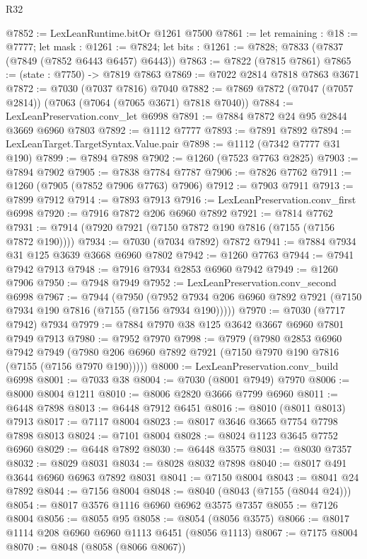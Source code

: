 \begin{lexlean}{R32}
\begin{coremodule}
@7852 := LexLeanRuntime.bitOr @1261 @7500
@7861 := let remaining : @18 := @7777;
  let mask : @1261 := @7824;
  let bits : @1261 := @7828; @7833 (@7837 (@7849 (@7852 @6443 @6457) @6443))
@7863 := @7822 (@7815 @7861)
@7865 := (state : @7750) -> @7819 @7863
@7869 := @7022 @2814 @7818 @7863 @3671
@7872 := @7030 (@7037 @7816) @7040
@7882 := @7869 @7872 (@7047 (@7057 @2814)) (@7063 (@7064 (@7065 @3671) @7818 @7040))
@7884 := LexLeanPreservation.conv_let @6998
@7891 := @7884 @7872 @24 @95 @2844 @3669 @6960 @7803
@7892 := @1112 @7777
@7893 := @7891 @7892
@7894 := LexLeanTarget.TargetSyntax.Value.pair
@7898 := @1112 (@7342 @7777 @31 @190)
@7899 := @7894 @7898
@7902 := @1260 (@7523 @7763 @2825)
@7903 := @7894 @7902
@7905 := @7838 @7784 @7787
@7906 := @7826 @7762
@7911 := @1260 (@7905 (@7852 @7906 @7763) @7906)
@7912 := @7903 @7911
@7913 := @7899 @7912
@7914 := @7893 @7913
@7916 := LexLeanPreservation.conv_first @6998
@7920 := @7916 @7872 @206 @6960 @7892
@7921 := @7814 @7762
@7931 := @7914 (@7920 @7921 (@7150 @7872 @190 @7816 (@7155 (@7156 @7872 @190))))
@7934 := @7030 (@7034 @7892) @7872
@7941 := @7884 @7934 @31 @125 @3639 @3668 @6960 @7802
@7942 := @1260 @7763
@7944 := @7941 @7942 @7913
@7948 := @7916 @7934 @2853 @6960 @7942
@7949 := @1260 @7906
@7950 := @7948 @7949
@7952 := LexLeanPreservation.conv_second @6998
@7967 := @7944
    (@7950 (@7952 @7934 @206 @6960 @7892 @7921 (@7150 @7934 @190 @7816 (@7155 (@7156 @7934 @190)))))
@7970 := @7030 (@7717 @7942) @7934
@7979 := @7884 @7970 @38 @125 @3642 @3667 @6960 @7801 @7949 @7913
@7980 := @7952 @7970
@7998 := @7979
    (@7980
      @2853
      @6960
      @7942
      @7949
      (@7980 @206 @6960 @7892 @7921 (@7150 @7970 @190 @7816 (@7155 (@7156 @7970 @190)))))
@8000 := LexLeanPreservation.conv_build @6998
@8001 := @7033 @38
@8004 := @7030 (@8001 @7949) @7970
@8006 := @8000 @8004 @1211
@8010 := @8006 @2820 @3666 @7799 @6960
@8011 := @6448 @7898
@8013 := @6448 @7912 @6451
@8016 := @8010 (@8011 @8013) @7913
@8017 := @7117 @8004
@8023 := @8017 @3646 @3665 @7754 @7798 @7898 @8013
@8024 := @7101 @8004
@8028 := @8024 @1123 @3645 @7752 @6960
@8029 := @6448 @7892
@8030 := @6448 @3575
@8031 := @8030 @7357
@8032 := @8029 @8031
@8034 := @8028 @8032 @7898
@8040 := @8017 @491 @3644 @6960 @6963 @7892 @8031
@8041 := @7150 @8004
@8043 := @8041 @24 @7892
@8044 := @7156 @8004
@8048 := @8040 (@8043 (@7155 (@8044 @24)))
@8054 := @8017 @3576 @1116 @6960 @6962 @3575 @7357
@8055 := @7126 @8004
@8056 := @8055 @95
@8058 := @8054 (@8056 @3575)
@8066 := @8017 @1114 @208 @6960 @6960 @1113 @6451 (@8056 @1113)
@8067 := @7175 @8004
@8070 := @8048 (@8058 (@8066 @8067))

\end{coremodule}
\end{lexlean}
